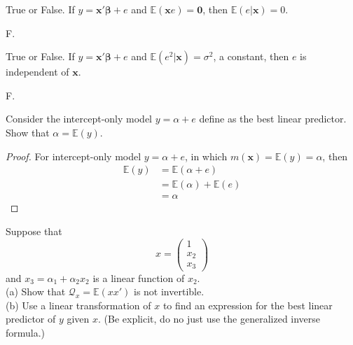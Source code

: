 \documentclass[12pt]{article}
\newenvironment{question}[2][Question]{\begin{trivlist}
\item[\hskip \labelsep {\bfseries #1}\hskip \labelsep {\bfseries #2.}]}{\end{trivlist}}
\newenvironment{answer}{{\noindent\it Answer.}}{\hfill \par}
\begin{document}
\begin{question}{2.13}
True or False. If $y = \mathbf{x}'\mathbf{\beta} +e$ and $\mathbb{E}(\mathbf{x}e) = \mathbf{0}$, then $\mathbb{E}(e|\mathbf{x}) = 0$.
\end{question}
\begin{answer}
F.
\end{answer}

\begin{question}{2.14}
True or False. If $y = \mathbf{x}'\mathbf{\beta} +e$ and $\mathbb{E}(e^2|\mathbf{x}) = \sigma^2$, a constant, then $e$ is independent of $\mathbf{x}$.
\end{question}
\begin{answer}
F.
\end{answer}

\begin{question}{2.15}
Consider the intercept-only model $y = \alpha+e$ define as the best linear predictor. Show that $\alpha = \mathbb{E}(y)$.
\end{question}

\begin{proof}
For intercept-only model $y = \alpha+e$, in which $m(\mathbf{x}) = \mathbb{E}(y) = \alpha$, then
\begin{align*}
\mathbb{E}(y) &= \mathbb{E}(\alpha+e)\\
&= \mathbb{E}(\alpha)+\mathbb{E}(e)\\
&= \alpha
\end{align*}

\end{proof}

\begin{question}{2.18}
Suppose that 
$$x = \begin{pmatrix} 1\\x_2\\x_3 \end{pmatrix}$$
and $x_3 = \alpha_1+\alpha_2 x_2$ is a linear function of $x_2$.\\
(a) Show that $\mathcal{Q}_{x} = \mathbb{E}(xx')$ is not invertible.\\
(b) Use a linear transformation of $x$ to find an expression for the best linear predictor of $y$ given $x$. (Be explicit, do no just use the generalized inverse formula.)
\end{question}
\end{document}
